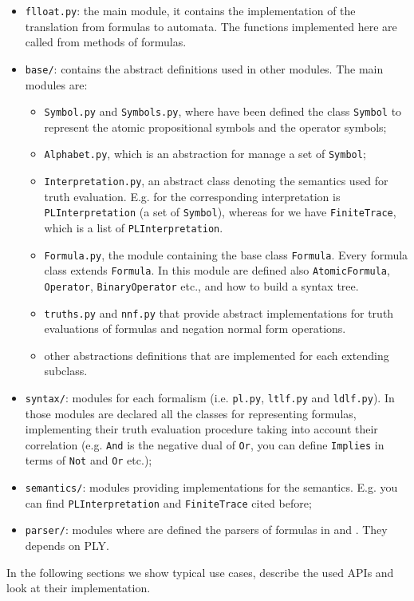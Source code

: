 \begin{itemize}
	\item \texttt{flloat.py}: the main module, it contains the implementation of the translation from \LLf formulas to automata. The functions implemented here are called from methods of \LLf formulas.
	\item \texttt{base/}: contains the abstract definitions used in other modules. The main modules are:
	\begin{itemize}
		\item \texttt{Symbol.py} and \texttt{Symbols.py}, where have been defined the class \texttt{Symbol} to represent the atomic propositional symbols and the operator symbols;
		\item \texttt{Alphabet.py}, which is an abstraction for manage a set of \texttt{Symbol};
		\item \texttt{Interpretation.py}, an abstract class denoting the semantics used for truth evaluation. E.g. for \PL the corresponding interpretation is \texttt{PLInterpretation} (a set of \texttt{Symbol}), whereas for \LLf we have \texttt{FiniteTrace}, which is a list of \texttt{PLInterpretation}.
		\item \texttt{Formula.py}, the module containing the base class \texttt{Formula}. Every formula class extends \texttt{Formula}. In this module are defined also \texttt{AtomicFormula}, \texttt{Operator}, \texttt{BinaryOperator} etc., and how to build a syntax tree. 
		\item \texttt{truths.py} and \texttt{nnf.py} that provide abstract implementations for truth evaluations of formulas and negation normal form operations.
		\item other abstractions definitions that are implemented for each extending subclass.
	\end{itemize}
	\item \texttt{syntax/}: modules for each formalism (i.e. \texttt{pl.py}, \texttt{ltlf.py} and \texttt{ldlf.py}). In those modules are declared all the classes for representing formulas, implementing their truth evaluation procedure  taking into account their correlation (e.g. \texttt{And} is the negative dual of \texttt{Or}, you can define \texttt{Implies} in terms of \texttt{Not} and \texttt{Or} etc.);
	\item \texttt{semantics/}: modules providing implementations for the semantics. E.g. you can find \texttt{PLInterpretation} and \texttt{FiniteTrace} cited before;
	\item \texttt{parser/}: modules where are defined the parsers of formulas in \PL and \LLf. They depends on PLY.
\end{itemize}
In the following sections we show typical use cases, describe the used APIs and look at their implementation.

